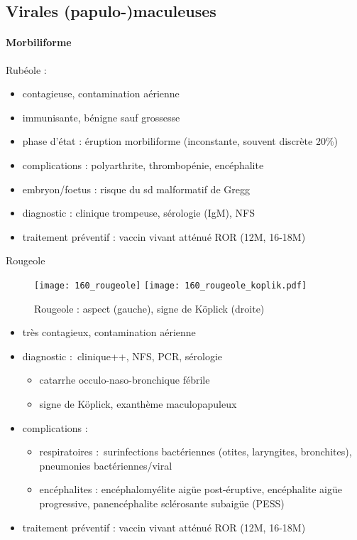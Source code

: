 \subsection{Virales (papulo-)maculeuses}

\paragraph{Morbiliforme}

Rubéole :

\begin{itemize}
\item contagieuse, contamination aérienne \item immunisante, bénigne sauf grossesse
\item phase d'état : éruption morbiliforme (inconstante, souvent discrète 20\%)
\item complications : polyarthrite, thrombopénie, encéphalite \item embryon/foetus : risque du sd malformatif de Gregg
\item diagnostic : clinique trompeuse, sérologie (IgM), NFS\\ \item traitement préventif : vaccin vivant atténué ROR (12M, 16-18M)
\end{itemize} 
Rougeole

\begin{figure}[htpb]
  \centering
  \caption{Rougeole : aspect (gauche), signe de Köplick (droite)}
  \texttt{[image: 160\_rougeole]}
  \texttt{[image: 160\_rougeole\_koplik.pdf]}
\end{figure}

\begin{itemize}
\item
  très contagieux, contamination aérienne
\item
  diagnostic :~clinique++, NFS, PCR, sérologie

  \begin{itemize}
  \item
    catarrhe occulo-naso-bronchique fébrile
  \item
    signe de Köplick, exanthème maculopapuleux
  \end{itemize}
\item
  complications :

  \begin{itemize}
  \item
    respiratoires :~surinfections bactériennes (otites, laryngites,
    bronchites), pneumonies bactériennes/viral
  \item
    encéphalites : encéphalomyélite aigüe post-éruptive, encéphalite
    aigüe progressive, panencéphalite sclérosante subaigüe (PESS)
  \end{itemize}
\item
  traitement préventif : vaccin vivant atténué ROR (12M, 16-18M)
\end{itemize}

